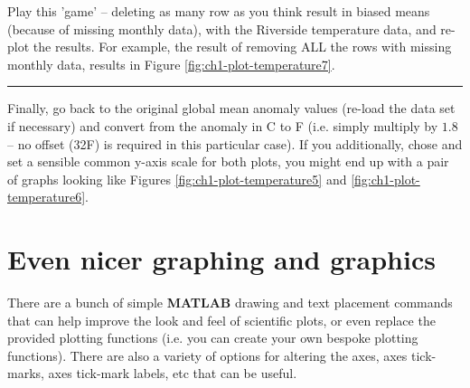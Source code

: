 \documentclass{tufte-book} %
\begin{document}
Play this 'game' -- deleting as many row as you think result in biased means (because of missing monthly data), with the Riverside temperature data, and re-plot the results.
For example, the result of removing ALL the rows with missing monthly data, results in Figure \ref{fig:ch1-plot-temperature7}.

\vspace{1mm}
\noindent\rule{4cm}{0.5pt}
\vspace{2mm}

\noindent Finally, go back to the original global mean anomaly values (re-load the data set if necessary) and convert from the anomaly in \degree C to \degree F (i.e. simply multiply by \(1.8\) -- no offset (32\degree F) is required in this particular case). If you additionally, chose and set a sensible common y-axis scale for both plots, you might end up with a pair of graphs looking like Figures \ref{fig:ch1-plot-temperature5} and \ref{fig:ch1-plot-temperature6}.


\newpage


\section{Even nicer graphing and graphics}

There are a bunch of simple \textbf{MATLAB} drawing and text placement commands that can help improve the look and feel of scientific plots, or even replace the provided plotting functions (i.e. you can create your own bespoke plotting functions). There are also a variety of options for altering the axes, axes tick-marks, axes tick-mark labels, etc that can be useful.
\end{document}
